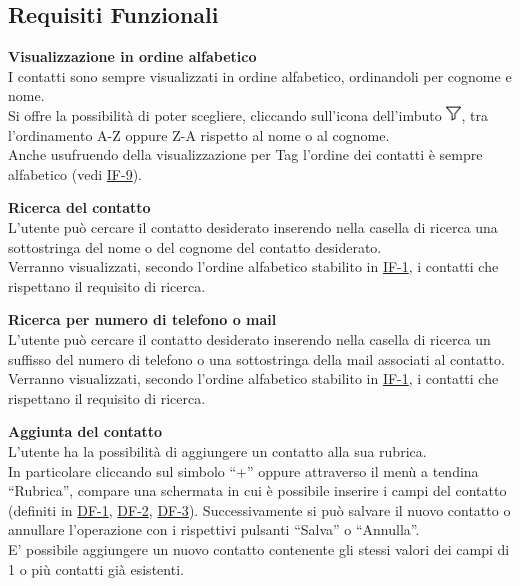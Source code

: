 \subsection{Requisiti Funzionali}
	\begin{tcolorbox}[breakable, colback=white,colframe=black!80!white,title=\textbf{Funzionalità individuali IF}]
	\begin{itemize}[itemsep=2pt, topsep=0pt]
		\hypertarget{IF-1}{\item[\textbf{IF-1}]} \textbf{Visualizzazione in ordine alfabetico}
		\\I contatti sono sempre visualizzati in ordine alfabetico, ordinandoli per cognome e nome. 
		\\Si offre la possibilità di poter scegliere, cliccando sull’icona dell’imbuto \includegraphics[height=0.4cm]{images/imbuto_icona.jpeg}, tra l’ordinamento A-Z oppure Z-A rispetto al nome o al cognome.
		\\Anche usufruendo della visualizzazione per Tag l’ordine dei contatti è sempre alfabetico (vedi \hyperlink{IF-9}{IF-9}).
		
		\item[\textbf{IF-2}] \textbf{Ricerca del contatto}
		\\L’utente può cercare il contatto desiderato inserendo nella casella di ricerca una sottostringa del nome o del cognome del contatto desiderato.
		\\Verranno visualizzati, secondo l’ordine alfabetico stabilito in \hyperlink{IF-1}{IF-1}, i contatti che rispettano il requisito di ricerca.
		
		\item[\textbf{IF-3}] \textbf{Ricerca per numero di telefono o mail}
		\\L’utente può cercare il contatto desiderato inserendo nella casella di ricerca un suffisso del numero di telefono o una sottostringa della mail associati al contatto. 
		\\Verranno visualizzati, secondo l’ordine alfabetico stabilito in \hyperlink{IF-1}{IF-1}, i contatti che rispettano il requisito di ricerca.				
		
		\item[\textbf{IF-4}] \textbf{Aggiunta del contatto}
		\\L’utente ha la possibilità di aggiungere un contatto alla sua rubrica.
		\\In particolare cliccando sul simbolo “+” oppure attraverso il menù a tendina “Rubrica”, compare una schermata in cui è possibile inserire i campi del contatto (definiti in \hyperlink{DF-1}{DF-1}, \hyperlink{DF-2}{DF-2}, \hyperlink{DF-3}{DF-3}).
		Successivamente si può salvare il nuovo contatto o annullare l’operazione con i rispettivi pulsanti “Salva” o “Annulla”.
		\\E’ possibile aggiungere un nuovo contatto contenente gli stessi valori dei campi di 1 o più contatti già esistenti.		
		

\end{itemize}
\end{tcolorbox}
